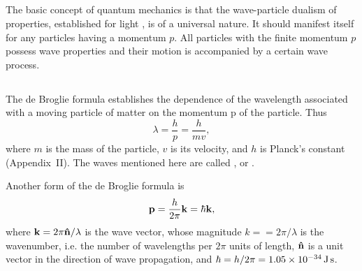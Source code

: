 \subsection{}\label{38.1.3} The basic concept of quantum mechanics is that the wave-particle dualism of properties, established for light , is of a universal nature. It should manifest itself for any particles
having a momentum $p$. All particles with the finite momentum
$p$ possess wave properties and their motion is accompanied
by a certain wave process.

\subsection{}\label{38.1.4} The de Broglie formula establishes the dependence of the wavelength associated with a moving particle of matter on the momentum p of the particle. Thus
\begin{equation*}%
\lambda = \frac{h}{p} = \frac{h}{mv},
\end{equation*}
where $m$ is the mass of the particle, $v$ is its velocity, and $h$ is Planck's constant (Appendix~II). The waves mentioned here are called , or .

Another form of the de Broglie formula is
\begin{equation*}%
\vb{p} = \frac{h}{2\pi} \vb{k} = \hbar \vb{k},
\end{equation*}
where $\vb{k} = 2\pi \vu{n}/\lambda$ is the wave vector, whose magnitude $k = = 2\pi/\lambda$ is the wavenumber, i.e. the number of wavelengths per $2\pi$ units of length, $\vu{n}$ is a unit vector in the direction of wave propagation, and $\hbar = h/2\pi = \SI{1.05d-34}{\joule\second}$.

